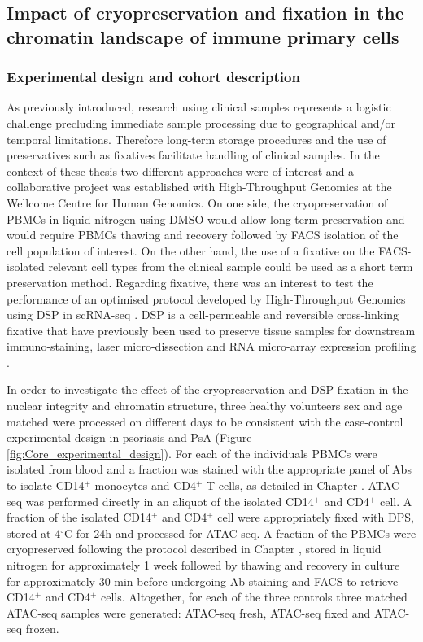 \subsection{Impact of cryopreservation and fixation in the chromatin landscape of immune primary cells}
\subsubsection{Experimental design and cohort description}
As previously introduced, research using clinical samples represents a logistic challenge precluding immediate sample processing due to geographical and/or temporal limitations. Therefore long-term storage procedures and the use of preservatives such as fixatives facilitate handling of clinical samples. In the context of these thesis two different approaches were of interest and a collaborative project was established with High-Throughput Genomics at the Wellcome Centre for Human Genomics. On one side, the cryopreservation of PBMCs in liquid nitrogen using DMSO would allow long-term preservation and would require PBMCs thawing and recovery followed by FACS isolation of the cell population of interest. On the other hand, the use of a fixative on the FACS-isolated relevant cell types from the clinical sample could be used as a short term preservation method. Regarding fixative, there was an interest to test the performance of an optimised protocol developed by High-Throughput Genomics using DSP in scRNA-seq \parencite{}. DSP is a cell-permeable and reversible cross-linking fixative that have previously been used to preserve tissue samples for downstream immuno-staining, laser micro-dissection and RNA micro-array expression profiling \parencite{}.

In order to investigate the effect of the cryopreservation and DSP fixation in the nuclear integrity and chromatin structure, three healthy volunteers sex and age matched were processed on different days to be consistent with the case-control experimental design in psoriasis and PsA (Figure \ref{fig:Core_experimental_design}). For each of the individuals PBMCs were isolated from blood and a fraction was stained with the appropriate panel of Abs to isolate CD14$^+$ monocytes and CD4$^+$ T cells, as detailed in Chapter \label{ch:Mat}. ATAC-seq was performed directly in an aliquot of the isolated CD14$^+$ and CD4$^+$ cell. A fraction of the isolated CD14$^+$ and CD4$^+$ cell were appropriately fixed with DPS, stored at 4{$^\circ$}C for 24h and processed for ATAC-seq. A fraction of the PBMCs were cryopreserved following the protocol described in Chapter \label{ch:Mat}, stored in liquid nitrogen for approximately 1 week followed by thawing and recovery in culture for approximately 30 min before undergoing Ab staining and FACS to retrieve CD14$^+$ and CD4$^+$ cells. Altogether, for each of the three controls three matched ATAC-seq samples were generated: ATAC-seq fresh, ATAC-seq fixed and ATAC-seq frozen.


